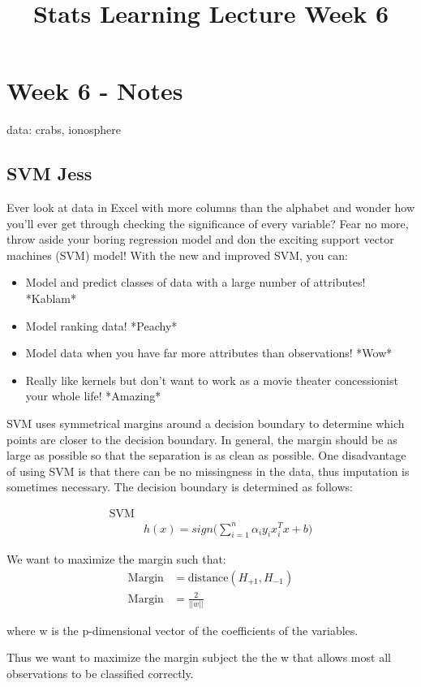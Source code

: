 \documentclass[a4paper]{article}
\title{Stats Learning Lecture Week 6}
\begin{document}
\section{Week 6 - Notes}

data: crabs, ionosphere

\subsection{SVM \textbf{Jess}}
Ever look at data in Excel with more columns than the alphabet and wonder how you'll ever get through checking the significance of every variable? Fear no more, throw aside your boring regression model and don the exciting support vector machines (SVM) model! With the new and improved SVM, you can:
\begin{itemize}
\item Model and predict classes of data with a large number of attributes! *Kablam*
\item Model ranking data! *Peachy*
\item Model data when you have far more attributes than observations! *Wow*
\item Really like kernels but don't want to work as a movie theater concessionist your whole life! *Amazing*
\end{itemize}


SVM uses symmetrical margins around a decision boundary to determine which points are closer to the decision boundary. In general, the margin should be as large as possible so that the separation is as clean as possible. One disadvantage of using SVM is that there can be no missingness in the data, thus imputation is sometimes necessary. The decision boundary is determined as follows:

\begin{align*}
\text{SVM} \\
& h(x)=sign\Bigg(\sum_{i=1}^n\alpha_iy_ix^T_ix+b\Bigg)
\end{align*}

We want to maximize the margin such that:
\begin{align*}
\text{Margin}&=\text{distance}(H_{+1},H_{-1})\\
\text{Margin}&=\frac{2}{||w||}
\end{align*}

where w is the p-dimensional vector of the coefficients of the variables.

Thus we want to maximize the margin subject the the w that allows most all observations to be classified correctly. 
\end{document}
